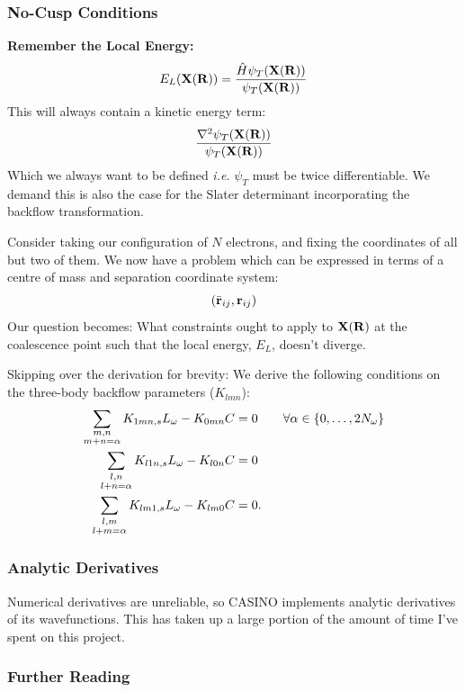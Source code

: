 \documentclass[10pt]{beamer}
\begin{document}
\begin{frame}[allowframebreaks]
    \frametitle{No-Cusp Conditions}
    \textbf{Remember the Local Energy:}
    \begin{equation}
        E_L\pqty{\vb{X}\pqty{\vb{R}}}=\frac{%
            \hat{H}\psi_T\pqty{\vb{X}\pqty{\vb{R}}}
        }{%
            \psi_T\pqty{\vb{X}\pqty{\vb{R}}}
        }
    \end{equation}
    This will always contain a kinetic energy term:
    \begin{equation}
        \frac{%
            \laplacian\psi_T\pqty{\vb{X}\pqty{\vb{R}}}
        }{%
            \psi_T\pqty{\vb{X}\pqty{\vb{R}}}
        }
    \end{equation}
    Which we always want to be defined \textit{i.e.} $\psi_T$ must be twice differentiable. We demand this is also the case for the Slater determinant incorporating the backflow transformation.\framebreak%

    Consider taking our configuration of $N$ electrons, and fixing the coordinates of all but two of them. We now have a problem which can be expressed in terms of a centre of mass and separation coordinate system:
    \begin{equation*}
        \pqty{\bar{\vb{r}}_{ij},\vb{r}_{ij}}
    \end{equation*}
    Our question becomes: What constraints ought to apply to $\vb{X}\pqty{\vb{R}}$ at the coalescence point such that the local energy, $E_L$, doesn't diverge.\framebreak%

    Skipping over the derivation for brevity:\newline
    We derive the following conditions on the three-body backflow parameters ($K_{lmn}$):
    \begin{align}
        \sum_{\substack{m,n\\m+n=\alpha}}K_{1mn,s}L_\omega-K_{0mn}C & =0\quad\quad\forall\alpha\in\qty{0,\ldots,2N_\omega} \nonumber \\
        \sum_{\substack{l,n\\l+n=\alpha}}K_{l1n,s}L_\omega-K_{l0n}C & =0 \nonumber \\
        \sum_{\substack{l,m\\l+m=\alpha}}K_{lm1,s}L_\omega-K_{lm0}C & =0.
    \end{align}
\end{frame}

\begin{frame}[allowframebreaks]
    \frametitle{Analytic Derivatives}
    Numerical derivatives are unreliable, so CASINO implements analytic derivatives of its wavefunctions. This has taken up a large portion of the amount of time I've spent on this project.
\end{frame}


\begin{frame}[allowframebreaks]
    \frametitle{Further Reading}
    
    

\end{frame}
\end{document}
